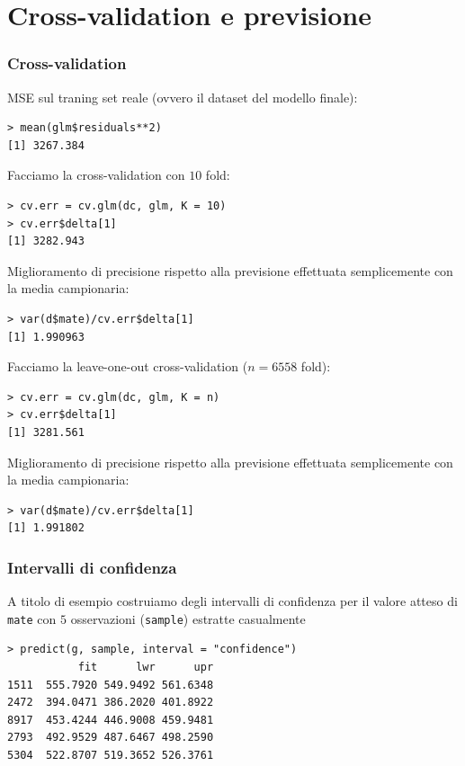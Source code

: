 \documentclass{beamer}
\begin{document}
\section{Cross-validation e previsione}

\begin{frame}[fragile]
\frametitle{Cross-validation}
MSE sul traning set reale (ovvero il dataset del modello finale):
\begin{verbatim}
> mean(glm$residuals**2)
[1] 3267.384
\end{verbatim}
\end{frame}

\begin{frame}[fragile]
Facciamo la cross-validation con $10$ fold:
\begin{verbatim}
> cv.err = cv.glm(dc, glm, K = 10)
> cv.err$delta[1]
[1] 3282.943
\end{verbatim}
Miglioramento di precisione rispetto alla previsione effettuata semplicemente con la media campionaria:
\begin{verbatim}
> var(d$mate)/cv.err$delta[1]
[1] 1.990963
\end{verbatim}
\end{frame}

\begin{frame}[fragile]
Facciamo la leave-one-out cross-validation ($n=6558$ fold):
\begin{verbatim}
> cv.err = cv.glm(dc, glm, K = n)
> cv.err$delta[1]
[1] 3281.561
\end{verbatim}
Miglioramento di precisione rispetto alla previsione effettuata semplicemente con la media campionaria:
\begin{verbatim}
> var(d$mate)/cv.err$delta[1]
[1] 1.991802
\end{verbatim}
\end{frame}

\begin{frame}[fragile]
\frametitle{Intervalli di confidenza}
A titolo di esempio costruiamo degli intervalli di confidenza per il valore atteso di \texttt{mate} con $5$ osservazioni (\texttt{sample}) estratte casualmente
{\scriptsize
\begin{verbatim}
> predict(g, sample, interval = "confidence")
           fit      lwr      upr
1511  555.7920 549.9492 561.6348
2472  394.0471 386.2020 401.8922
8917  453.4244 446.9008 459.9481
2793  492.9529 487.6467 498.2590
5304  522.8707 519.3652 526.3761
\end{verbatim}
}
\end{frame}
\end{document}
